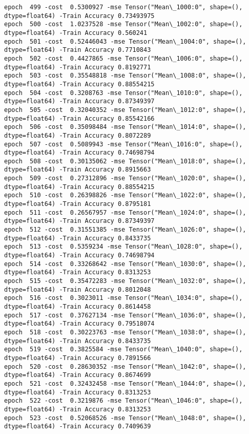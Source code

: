 \documentclass[11pt]{article}
\begin{document}
\begin{Verbatim}[commandchars=\\\{\}]
epoch  499 -cost  0.5300927 -mse Tensor("Mean\_1000:0", shape=(), dtype=float64) -Train Accuracy 0.73493975
epoch  500 -cost  1.0237528 -mse Tensor("Mean\_1002:0", shape=(), dtype=float64) -Train Accuracy 0.560241
epoch  501 -cost  0.52446043 -mse Tensor("Mean\_1004:0", shape=(), dtype=float64) -Train Accuracy 0.7710843
epoch  502 -cost  0.4427865 -mse Tensor("Mean\_1006:0", shape=(), dtype=float64) -Train Accuracy 0.8192771
epoch  503 -cost  0.35548818 -mse Tensor("Mean\_1008:0", shape=(), dtype=float64) -Train Accuracy 0.88554215
epoch  504 -cost  0.3208763 -mse Tensor("Mean\_1010:0", shape=(), dtype=float64) -Train Accuracy 0.87349397
epoch  505 -cost  0.32040352 -mse Tensor("Mean\_1012:0", shape=(), dtype=float64) -Train Accuracy 0.85542166
epoch  506 -cost  0.35098484 -mse Tensor("Mean\_1014:0", shape=(), dtype=float64) -Train Accuracy 0.8072289
epoch  507 -cost  0.5089943 -mse Tensor("Mean\_1016:0", shape=(), dtype=float64) -Train Accuracy 0.74698794
epoch  508 -cost  0.30135062 -mse Tensor("Mean\_1018:0", shape=(), dtype=float64) -Train Accuracy 0.8915663
epoch  509 -cost  0.27312896 -mse Tensor("Mean\_1020:0", shape=(), dtype=float64) -Train Accuracy 0.88554215
epoch  510 -cost  0.26398826 -mse Tensor("Mean\_1022:0", shape=(), dtype=float64) -Train Accuracy 0.8795181
epoch  511 -cost  0.26567957 -mse Tensor("Mean\_1024:0", shape=(), dtype=float64) -Train Accuracy 0.87349397
epoch  512 -cost  0.31551385 -mse Tensor("Mean\_1026:0", shape=(), dtype=float64) -Train Accuracy 0.8433735
epoch  513 -cost  0.5359234 -mse Tensor("Mean\_1028:0", shape=(), dtype=float64) -Train Accuracy 0.74698794
epoch  514 -cost  0.33268642 -mse Tensor("Mean\_1030:0", shape=(), dtype=float64) -Train Accuracy 0.8313253
epoch  515 -cost  0.35472283 -mse Tensor("Mean\_1032:0", shape=(), dtype=float64) -Train Accuracy 0.8012048
epoch  516 -cost  0.3023011 -mse Tensor("Mean\_1034:0", shape=(), dtype=float64) -Train Accuracy 0.8614458
epoch  517 -cost  0.37627134 -mse Tensor("Mean\_1036:0", shape=(), dtype=float64) -Train Accuracy 0.79518074
epoch  518 -cost  0.30223763 -mse Tensor("Mean\_1038:0", shape=(), dtype=float64) -Train Accuracy 0.8433735
epoch  519 -cost  0.3825584 -mse Tensor("Mean\_1040:0", shape=(), dtype=float64) -Train Accuracy 0.7891566
epoch  520 -cost  0.28630352 -mse Tensor("Mean\_1042:0", shape=(), dtype=float64) -Train Accuracy 0.8674699
epoch  521 -cost  0.32432458 -mse Tensor("Mean\_1044:0", shape=(), dtype=float64) -Train Accuracy 0.8313253
epoch  522 -cost  0.3219876 -mse Tensor("Mean\_1046:0", shape=(), dtype=float64) -Train Accuracy 0.8313253
epoch  523 -cost  0.52068526 -mse Tensor("Mean\_1048:0", shape=(), dtype=float64) -Train Accuracy 0.7409639

\end{Verbatim}
\end{document}
